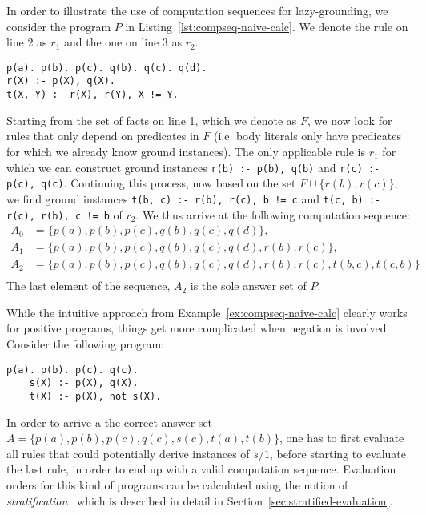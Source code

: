 \begin{example}
\label{ex:compseq-naive-calc}
In order to illustrate the use of computation sequences for lazy-grounding, we consider the program $P$ in Listing~\ref{lst:compseq-naive-calc}. We denote the rule on line 2 as $r_1$ and the one on line 3 as $r_2$.
\begin{lstlisting}[style=asp-code, label={lst:compseq-naive-calc}, caption={A positive, non-ground program}]
p(a). p(b). p(c). q(b). q(c). q(d).
r(X) :- p(X), q(X).
t(X, Y) :- r(X), r(Y), X != Y.	
\end{lstlisting}
Starting from the set of facts on line 1, which we denote as $F$, we now look for rules that only depend on predicates in $F$ (i.e. body literals only have predicates for which we already know ground instances). The only applicable rule is $r_1$ for which we  can construct ground instances \texttt{r(b) :- p(b), q(b)} and \texttt{r(c) :- p(c), q(c)}. Continuing this process, now based on the set $F \cup \{r(b),r(c)\}$, we find ground instances \texttt{t(b, c) :- r(b), r(c), b != c} and \texttt{t(c, b) :- r(c), r(b), c != b} of $r_2$. We thus arrive at the following computation sequence:
\begin{align*}
	A_0 &= \{p(a), p(b), p(c), q(b), q(c), q(d)\},\\
	A_1 &= \{p(a), p(b), p(c), q(b), q(c), q(d), r(b), r(c)\},\\
	A_2 &= \{p(a), p(b), p(c), q(b), q(c), q(d), r(b), r(c), t(b, c), t(c, b)\}\\
\end{align*}	
The last element of the sequence, $A_2$ is the sole answer set of $P$.
\end{example}	

While the intuitive approach from Example~\ref{ex:compseq-naive-calc} clearly works for positive programs, things get more complicated when negation is involved. Consider the following program:
\begin{lstlisting}[style=asp-code]
	p(a). p(b). p(c). q(c).
	s(X) :- p(X), q(X).
	t(X) :- p(X), not s(X).
\end{lstlisting}
In order to arrive a the correct answer set $A = \{p(a), p(b), p(c), q(c), s(c), t(a), t(b)\}$, one has to first evaluate all rules that could potentially derive instances of $s/1$, before starting to evaluate the last rule, in order to end up with a valid computation sequence. Evaluation orders for this kind of programs can be calculated using the notion of \emph{stratification}~\cite{stratification} which is described in detail in Section~\ref{sec:stratified-evaluation}.

